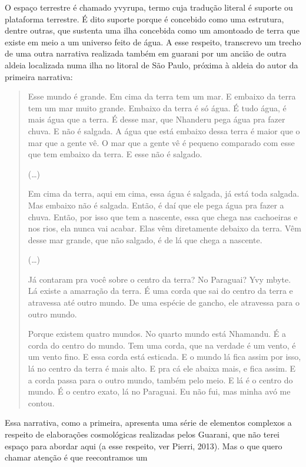 O espaço terrestre é chamado yvyrupa, termo cuja tradução literal é
suporte ou plataforma terrestre. É dito suporte porque é concebido como
uma estrutura, dentre outras, que sustenta uma ilha concebida como um
amontoado de terra que existe em meio a um universo feito de água. A
esse respeito, transcrevo um trecho de uma outra narrativa realizada
também em guarani por um ancião de outra aldeia localizada numa ilha no
litoral de São Paulo, próxima à aldeia do autor da primeira narrativa:

\begin{quotation}
Esse mundo é grande. Em cima da terra tem um mar. E embaixo da terra tem
um mar muito grande. Embaixo da terra é só água. É tudo água, é mais
água que a terra. É desse mar, que Nhanderu pega água pra fazer chuva.
E não é salgada. A água que está embaixo dessa terra é maior que o mar
que a gente vê. O mar que a gente vê é pequeno comparado com esse que
tem embaixo da terra. E esse não é salgado.

(\ldots{})

Em cima da terra, aqui em cima, essa água é salgada, já está toda
salgada. Mas embaixo não é salgada. Então, é daí que ele pega água pra
fazer a chuva. Então, por isso que tem a nascente, essa que chega nas
cachoeiras e nos rios, ela nunca vai acabar. Elas vêm diretamente
debaixo da terra. Vêm desse mar grande, que não salgado, é de lá que
chega a nascente.

(\ldots{}) 

Já contaram pra você sobre o centro da terra? No Paraguai? Yvy mbyte. Lá
existe a amarração da terra. É uma corda que sai do centro da terra e
atravessa até outro mundo. De uma espécie de gancho, ele atravessa para
o outro mundo.

Porque existem quatro mundos. No quarto mundo está Nhamandu. É a corda
do centro do mundo. Tem uma corda, que na verdade é um vento, é um
vento fino. E essa corda está esticada. E o mundo lá fica assim por
isso, lá no centro da terra é mais alto. E pra cá ele abaixa mais, e
fica assim. E a corda passa para o outro mundo, também pelo meio. E lá
é o centro do mundo. É o centro exato, lá no Paraguai. Eu não fui, mas
minha avó me contou.

\end{quotation}
Essa narrativa, como a primeira, apresenta uma série de elementos
complexos a respeito de elaborações cosmológicas realizadas pelos
Guarani, que não terei espaço para abordar aqui (a esse respeito, ver
Pierri, 2013). Mas o que quero chamar atenção é que reecontramos um
